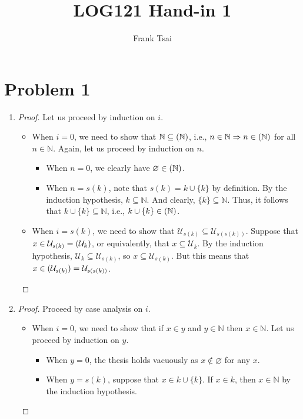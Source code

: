 \documentclass[a4paper]{article}
\title{LOG121 Hand-in 1}
\author{Frank Tsai}
\newcommand{\N}{\mathbb{N}}
\let\P\relax
\newcommand{\P}{\mathcal{P}}
\newcommand{\U}{\mathcal{U}}
\newcommand{\impl}{\Rightarrow}
\begin{document}
\maketitle

\section*{Problem 1}
\begin{enumerate}
\item\label{prob:1-1}
  \begin{proof}
    Let us proceed by induction on $i$.
    \begin{itemize}
    \item When $i = 0$, we need to show that $\N \subseteq \P(\N)$, i.e., $n \in \N \impl n \in \P(\N)$ for all $n \in \N$.
      Again, let us proceed by induction on $n$.
      \begin{itemize}
      \item When $n = 0$, we clearly have $\varnothing \in \P(\N)$.
      \item When $n = s(k)$, note that $s(k) = k \cup \{k\}$ by definition.
        By the induction hypothesis, $k \subseteq \N$.
        And clearly, $\{k\} \subseteq \N$.
        Thus, it follows that $k \cup \{k\} \subseteq \N$, i.e., $k \cup \{k\} \in \P(\N)$.
      \end{itemize}
    \item When $i = s(k)$, we need to show that $\U_{s(k)} \subseteq \U_{s(s(k))}$.
      Suppose that $x \in \U_{s(k)} = \P(\U_{k})$, or equivalently, that $x \subseteq \U_{k}$.
      By the induction hypothesis, $\U_{k} \subseteq \U_{s(k)}$, so $x \subseteq \U_{s(k)}$.
      But this means that $x \in \P(\U_{s(k)}) = \U_{s(s(k))}$.
    \end{itemize}
  \end{proof}
\item\label{prob:1-2}
  \begin{proof}
    Proceed by case analysis on $i$.
    \begin{itemize}
    \item When $i = 0$, we need to show that if $x \in y$ and $y \in \N$ then $x \in \N$.
      Let us proceed by induction on $y$.
      \begin{itemize}
      \item When $y = 0$, the thesis holds vacuously as $x \notin \varnothing$ for any $x$.
      \item When $y = s(k)$, suppose that $x \in k \cup \{k\}$.
        If $x \in k$, then $x \in \N$ by the induction hypothesis.

\end{itemize}
\end{itemize}
\end{proof}
\end{enumerate}
\end{document}
